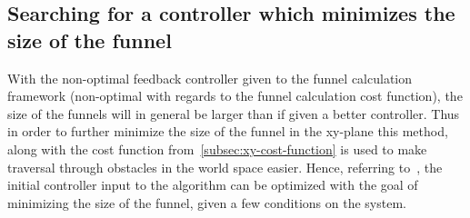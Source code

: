 \subsection{Searching for a controller which minimizes the size of the funnel}
\label{subsec:searching-for-a-controller}

With the non-optimal feedback controller given to the funnel calculation
framework (non-optimal with regards to the funnel calculation cost function),
the size of the funnels will in general be larger than if given a better
controller. Thus in order to further minimize the size of the funnel in the
xy-plane this method, along with the cost function
from~\cref{subsec:xy-cost-function} is used to make traversal through obstacles
in the world space easier. Hence, referring to~\cite[Majumdar.sec~4.3.2
(Feedback control synthesis)]{majumdarFunnelLibrariesRealtime2017}, the initial
controller input to the algorithm can be optimized with the goal of minimizing
the size of the funnel, given a few conditions on the system.

